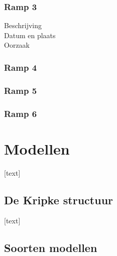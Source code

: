 \documentclass{article}
\begin{document}
			\subsubsection{Ramp 3}
			\begin{description}
			\item[Beschrijving]
			\item[Datum en plaats] 
			\item[Oorzaak]
			\end{description}
			
			\subsubsection{Ramp 4}
			\subsubsection{Ramp 5}
			\subsubsection{Ramp 6}
		
	\newpage
	
	
	\section{Modellen}
	
	[text]
	
		\subsection{De Kripke structuur}
		
		[text]
		
		\subsection{Soorten modellen}
		
		\newpage
		
\end{document}
